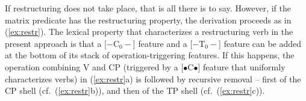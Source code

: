 \documentclass[output=paper]{langsci/langscibook}
\begin{document}

If restructuring does not take place, that is all there is to say. However, if
the matrix  predicate has the restructuring property, the derivation
proceeds as in (\ref{ex:restr}). The lexical property that characterizes a
restructuring verb in the present approach is that a [$-\text{C}_0-$] feature
and a [$-\text{T}_0-$] feature can be added at the bottom of its stack of
operation-triggering features. If this happens, the  operation combining V
and CP (triggered by a [{\small $\bullet$}C{\small $\bullet$}] feature that
uniformly characterizes  verbs) in (\ref{ex:restr}a) is followed by
recursive removal -- first of the CP shell (cf.\ (\ref{ex:restr}b)), and then
of the TP shell (cf.\  (\ref{ex:restr}c)).%
\end{document}
